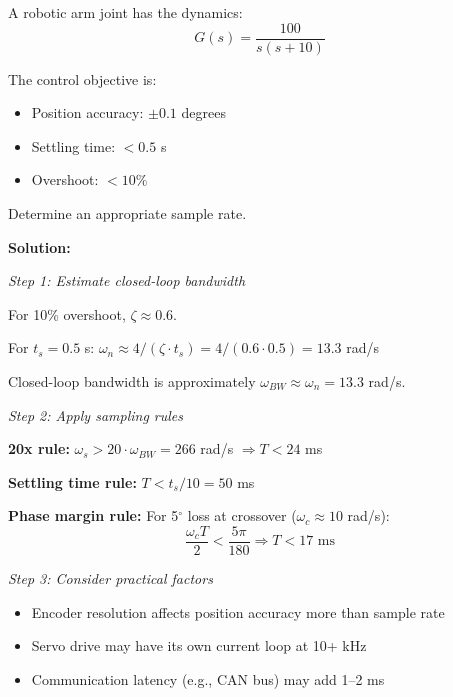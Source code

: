 \begin{example}
\label{ex:sample_rate_robot}

A robotic arm joint has the dynamics:
\begin{equation}
G(s) = \frac{100}{s(s + 10)}
\end{equation}

The control objective is:
\begin{itemize}
    \item Position accuracy: $\pm 0.1$ degrees
    \item Settling time: $< 0.5$ s
    \item Overshoot: $< 10\%$
\end{itemize}

Determine an appropriate sample rate.

\textbf{Solution:}

\textit{Step 1: Estimate closed-loop bandwidth}

For 10\% overshoot, $\zeta \approx 0.6$.

For $t_s = 0.5$ s: $\omega_n \approx 4/(\zeta \cdot t_s) = 4/(0.6 \cdot 0.5) = 13.3$ rad/s

Closed-loop bandwidth is approximately $\omega_{BW} \approx \omega_n = 13.3$ rad/s.

\textit{Step 2: Apply sampling rules}

\textbf{20x rule:} $\omega_s > 20 \cdot \omega_{BW} = 266$ rad/s $\Rightarrow T < 24$ ms

\textbf{Settling time rule:} $T < t_s/10 = 50$ ms

\textbf{Phase margin rule:} For 5$^\circ$ loss at crossover ($\omega_c \approx 10$ rad/s):
\begin{equation}
\frac{\omega_c T}{2} < \frac{5\pi}{180} \Rightarrow T < 17 \text{ ms}
\end{equation}

\textit{Step 3: Consider practical factors}

\begin{itemize}
    \item Encoder resolution affects position accuracy more than sample rate
    \item Servo drive may have its own current loop at 10+ kHz
    \item Communication latency (e.g., CAN bus) may add 1--2 ms
\end{itemize}


\end{example}
